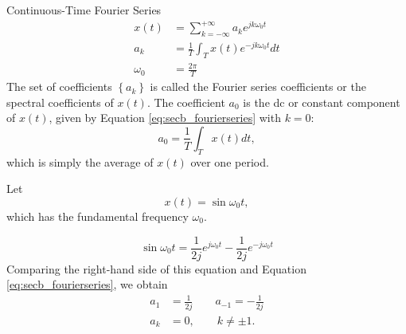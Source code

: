 \begin{frame}{Continuous-Time Fourier Series}
    {
        \begin{equation}\label{eq:secb_fourierseries}
            \begin{aligned}
                x(t) &= \sum_{k=-\infty}^{+\infty}a_k e^{jk\omega_0 t}\\
                a_k &= \frac{1}{T} \int_{T}x(t)e^{-jk\omega_0 t}dt\\
                \omega_0 &= \frac{2\pi}{T}
            \end{aligned}
        \end{equation}
        The set of coefficients $\left\{a_k\right\}$ is called the \alert{Fourier series coefficients} or the \alert{spectral coefficients} of $x(t)$.
        The coefficient $a_0$ is the dc or constant component of $x(t)$, given by Equation \ref{eq:secb_fourierseries} with $k=0$:
        \begin{equation}\label{eq:secb_a0}
            a_0 = \frac{1}{T} \int_{T}x(t)dt,
        \end{equation}
        which is simply the average of $x(t)$ over one period.
    }
\end{frame}

\begin{frame}[plain]
    \begin{example}
        Let
        \begin{equation*}
            x(t) = \sin \omega_0t,
        \end{equation*}
        which has the fundamental frequency $\omega_0$.
    \end{example}
    \pause
    \pause
    {
        \begin{equation*}
            \sin \omega_0t = \frac{1}{2j}e^{j\omega_0 t}- \frac{1}{2j}e^{-j\omega_0 t}
        \end{equation*}
        Comparing the right-hand side of this equation and Equation \ref{eq:secb_fourierseries}, we obtain
        \begin{equation*}
            \begin{split}
            a_1 &=  \frac{1}{2j} \qquad a_{-1} = -\frac{1}{2j}\\
            a_k &=0, \qquad k \neq \pm 1.\\
            \end{split}
        \end{equation*}
    }
\end{frame}

